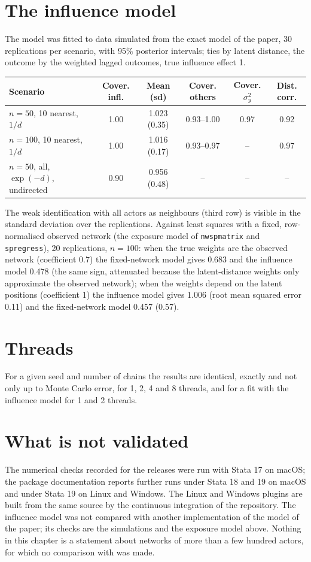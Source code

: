 \section{The influence model}

The model was fitted to data simulated from the exact model of the paper, 30 replications per scenario, with 95\% posterior intervals; ties by latent distance, the outcome by the weighted lagged outcomes, true influence effect 1.

\begin{center}\footnotesize\setlength{\tabcolsep}{4pt}
\begin{tabular}{@{}lccccc@{}}
\toprule Scenario & Cover. infl. & Mean (sd) & Cover. others & Cover. $\sigma_y^2$ & Dist. corr. \\ \midrule
$n=50$, 10 nearest, $1/d$ & 1.00 & 1.023 (0.35) & 0.93--1.00 & 0.97 & 0.92 \\
$n=100$, 10 nearest, $1/d$ & 1.00 & 1.016 (0.17) & 0.93--0.97 & -- & 0.97 \\
$n=50$, all, $\exp(-d)$, undirected & 0.90 & 0.956 (0.48) & -- & -- & -- \\
\bottomrule
\end{tabular}
\end{center}
The weak identification with all actors as neighbours (third row) is visible in the standard deviation over the replications. Against least squares with a fixed, row-normalised observed network (the exposure model of \texttt{nwspmatrix} and \texttt{spregress}), 20 replications, $n=100$: when the true weights are the observed network (coefficient 0.7) the fixed-network model gives 0.683 and the influence model 0.478 (the same sign, attenuated because the latent-distance weights only approximate the observed network); when the weights depend on the latent positions (coefficient 1) the influence model gives 1.006 (root mean squared error 0.11) and the fixed-network model 0.457 (0.57).

\section{Threads}

For a given seed and number of chains the results are identical, exactly and not only up to Monte Carlo error, for 1, 2, 4 and 8 threads, and for a fit with the influence model for 1 and 2 threads.

\section{What is not validated}

The numerical checks recorded for the releases were run with Stata 17 on macOS; the package documentation reports further runs under Stata 18 and 19 on macOS and under Stata 19 on Linux and Windows. The Linux and Windows plugins are built from the same source by the continuous integration of the repository. The influence model was not compared with another implementation of the model of the paper; its checks are the simulations and the exposure model above. Nothing in this chapter is a statement about networks of more than a few hundred actors, for which no comparison with \latentnet{} was made.
